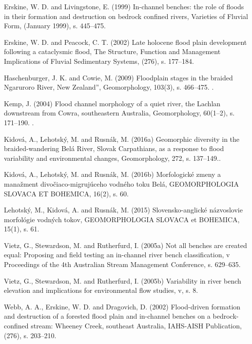 {Erskine, W. D. and Livingstone, E. (1999) In-channel benches: the role of floods in their formation and destruction on bedrock confined rivers, Varieties of Fluvial Form, (January 1999), s. 445–475.

Erskine, W. D. and Peacock, C. T. (2002) Late holocene flood plain development following a cataclysmic flood, The Structure, Function and Management Implications of Fluvial Sedimentary Systems, (276), s. 177–184.

Haschenburger, J. K. and Cowie, M. (2009) Floodplain stages in the braided Ngaruroro River, New Zealand”, Geomorphology, 103(3), s. 466–475. .

Kemp, J. (2004) Flood channel morphology of a quiet river, the Lachlan downstream from Cowra, southeastern Australia, Geomorphology, 60(1–2), s. 171–190. .

Kidová, A., Lehotský, M. and Rusnák, M. (2016a) Geomorphic diversity in the braided-wandering Belá River, Slovak Carpathians, as a response to flood variability and environmental changes, Geomorphology, 272, s. 137–149..

Kidová, A., Lehotský, M. and Rusnák, M. (2016b) Morfologické zmeny a manažment divočiaco-migrujúceho vodného toku Belá, GEOMORPHOLOGIA SLOVACA ET BOHEMICA, 16(2), s. 60.

Lehotský, M., Kidová, A. and Rusnák, M. (2015) Slovensko-anglické názvoslovie morfológie vodných tokov, GEOMORPHOLOGIA SLOVACA et BOHEMICA, 15(1), s. 61.

Vietz, G., Stewardson, M. and Rutherfurd, I. (2005a) Not all benches are created equal: Proposing and field testing an in-channel river bench classification, v Proceedings of the 4th Australian Stream Management Conference, s. 629–635.

Vietz, G., Stewardson, M. and Rutherfurd, I. (2005b) Variability in river bench elevation and implications for environmental flow studies, v, s. 8.

Webb, A. A., Erskine, W. D. and Dragovich, D. (2002) Flood-driven formation and destruction of a forested flood plain and in-channel benches on a bedrock-confined stream: Wheeney Creek, southeast Australia, IAHS-AISH Publication, (276), s. 203–210.
}%

